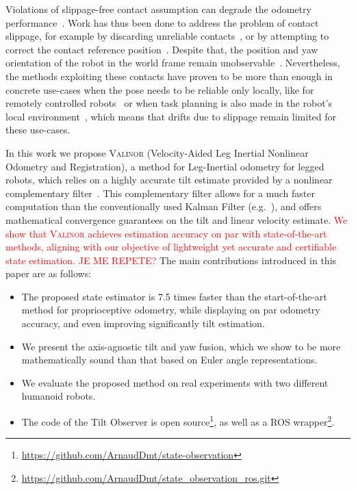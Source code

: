 \documentclass{IJCAS}
\begin{document}
 Violations of slippage-free contact assumption can degrade the odometry performance~\cite{lin2021legged, maravgakis2023probabilistic}. Work has thus been done to address the problem of contact slippage, for example by discarding unreliable contacts~\cite{lin2021legged, maravgakis2023probabilistic,yoon2023InvariantSmootherDynamicContactEventInformation}, or by attempting to correct the contact reference position~\cite{bloesch2013FusionLegKineAndImu,Hartley2020RIEKF, Demont2024KineticsObserver}. Despite that, the position and yaw orientation of the robot in the world frame remain unobservable~\cite{bloesch2013FusionLegKineAndImu}. Nevertheless, the methods exploiting these contacts have proven to be more than enough in concrete use-cases when the pose needs to be reliable only locally, like for remotely controlled robots~\cite{Grandia2024DesignControlBipedalRoboticCharacter} or when task planning is also made in the robot's local environment~\cite{Tsuru2023OnlineMulticontactReplanningHumanoid}, which means that drifts due to slippage remain limited for these use-cases.

In this work we propose {\scshape Valinor} (Velocity-Aided Leg Inertial Nonlinear Odometry and Registration), a method for Leg-Inertial odometry for legged robots, which relies on a highly accurate tilt estimate provided by a nonlinear complementary filter~\cite{benallegue2020LyapunovStableOrientationEstimatorHumanoids}. This complementary filter allows for a much faster computation than the conventionally used Kalman Filter (e.g.~\cite{Hartley2020RIEKF}), and offers mathematical convergence guarantees on the tilt and linear velocity estimate. \textcolor{red}{We show that {\scshape Valinor} achieves estimation accuracy on par with state-of-the-art methods, aligning with our objective of lightweight yet accurate and certifiable state estimation. JE ME REPETE?}
The main contributions introduced in this paper are as follows:
\begin{itemize}
  \item The proposed state estimator is 7.5 times faster than the start-of-the-art method for proprioceptive odometry, while displaying on par odometry accuracy, and even improving significantly tilt estimation.
  \item We present the axis-agnostic tilt and yaw fusion, which we show to be more mathematically sound than that based on Euler angle representations.
  \item We evaluate the proposed method on real experiments with two different humanoid robots.
  \item The code of the Tilt Observer is open source\footnote{\scriptsize \url{https://github.com/ArnaudDmt/state-observation}}, as well as a ROS wrapper\footnote{\scriptsize \url{https://github.com/ArnaudDmt/state_observation_ros.git}}.
\end{itemize}
\end{document}
